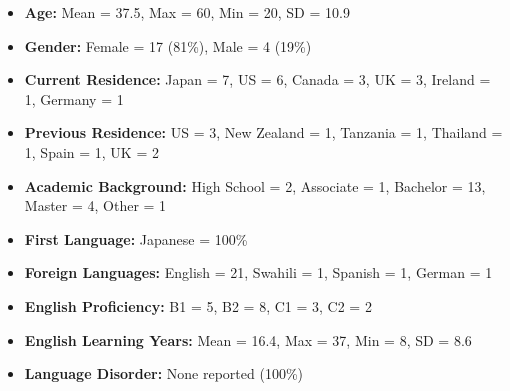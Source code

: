 \documentclass[
]{article}
\providecommand{\tightlist}{%
  \setlength{\itemsep}{0pt}\setlength{\parskip}{0pt}}
\begin{document}
\vspace{1em}

\begin{itemize}
\tightlist
\item
  \textbf{Age:} Mean = 37.5, Max = 60, Min = 20, SD = 10.9\\
\item
  \textbf{Gender:} Female = 17 (81\%), Male = 4 (19\%)\\
\item
  \textbf{Current Residence:} Japan = 7, US = 6, Canada = 3, UK = 3,
  Ireland = 1, Germany = 1\\
\item
  \textbf{Previous Residence:} US = 3, New Zealand = 1, Tanzania = 1,
  Thailand = 1, Spain = 1, UK = 2\\
\item
  \textbf{Academic Background:} High School = 2, Associate = 1, Bachelor
  = 13, Master = 4, Other = 1\\
\item
  \textbf{First Language:} Japanese = 100\%\\
\item
  \textbf{Foreign Languages:} English = 21, Swahili = 1, Spanish = 1,
  German = 1\\
\item
  \textbf{English Proficiency:} B1 = 5, B2 = 8, C1 = 3, C2 = 2\\
\item
  \textbf{English Learning Years:} Mean = 16.4, Max = 37, Min = 8, SD =
  8.6\\
\item
  \textbf{Language Disorder:} None reported (100\%)
\end{itemize}
\end{document}
